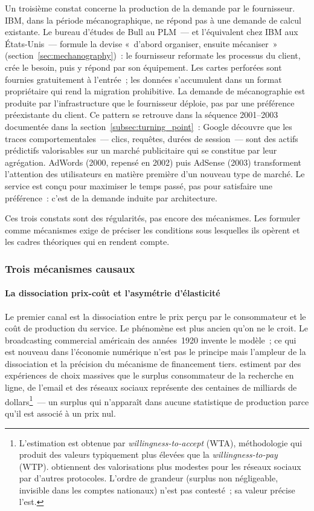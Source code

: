 Un troisième constat concerne la production de la demande par le fournisseur. IBM, dans la période mécanographique, ne répond pas à une demande de calcul existante. Le bureau d'études de Bull au PLM~--- et l'équivalent chez IBM aux États-Unis~--- formule la devise «~d'abord organiser, ensuite mécaniser~» (section~\ref{sec:mechanography})~: le fournisseur reformate les processus du client, crée le besoin, puis y répond par son équipement. Les cartes perforées sont fournies gratuitement à l'entrée~; les données s'accumulent dans un format propriétaire qui rend la migration prohibitive. La demande de mécanographie est produite par l'infrastructure que le fournisseur déploie, pas par une préférence préexistante du client. Ce pattern se retrouve dans la séquence 2001--2003 documentée dans la section~\ref{subsec:turning_point}~: Google découvre que les traces comportementales~--- clics, requêtes, durées de session~--- sont des actifs prédictifs valorisables sur un marché publicitaire qui se constitue par leur agrégation. AdWords (2000, repensé en 2002) puis AdSense (2003) transforment l'attention des utilisateurs en matière première d'un nouveau type de marché. Le service est conçu pour maximiser le temps passé, pas pour satisfaire une préférence~: c'est de la demande induite par architecture.

Ces trois constats sont des régularités, pas encore des mécanismes. Les formuler comme mécanismes exige de préciser les conditions sous lesquelles ils opèrent et les cadres théoriques qui en rendent compte.


\subsubsection{Trois mécanismes causaux}

\paragraph{La dissociation prix-coût et l'asymétrie d'élasticité}

\markNEO \markINFO

Le premier canal est la dissociation entre le prix perçu par le consommateur et le coût de production du service. Le phénomène est plus ancien qu'on ne le croit. Le broadcasting commercial américain des années~1920 invente le modèle~; ce qui est nouveau dans l'économie numérique n'est pas le principe mais l'ampleur de la dissociation et la précision du mécanisme de financement tiers. \textcite{brynjolfsson_using_2019} estiment par des expériences de choix massives que le surplus consommateur de la recherche en ligne, de l'email et des réseaux sociaux représente des centaines de milliards de dollars\footnote{L'estimation est obtenue par \emph{willingness-to-accept} (WTA), méthodologie qui produit des valeurs typiquement plus élevées que la \emph{willingness-to-pay} (WTP). \textcite{allcott_welfare_2020} obtiennent des valorisations plus modestes pour les réseaux sociaux par d'autres protocoles. L'ordre de grandeur (surplus non négligeable, invisible dans les comptes nationaux) n'est pas contesté~; sa valeur précise l'est.}~--- un surplus qui n'apparaît dans aucune statistique de production parce qu'il est associé à un prix nul.

